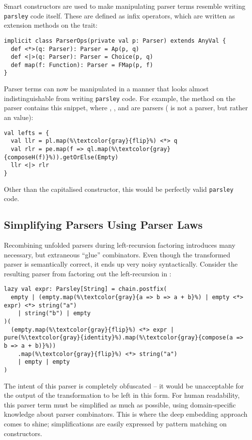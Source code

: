 \documentclass[../../../main.tex]{subfiles}
\begin{document}
Smart constructors are used to make manipulating parser terms resemble writing \texttt{parsley} code itself.
These are defined as infix operators, which are written as extension methods on the  trait:
\begin{verbatim}
implicit class ParserOps(private val p: Parser) extends AnyVal {
  def <*>(q: Parser): Parser = Ap(p, q)
  def <|>(q: Parser): Parser = Choice(p, q)
  def map(f: Function): Parser = FMap(p, f)
}
\end{verbatim}
%
Parser terms can now be manipulated in a manner that looks almost indistinguishable from writing \texttt{parsley} code.
For example, the  method on the  parser contains this snippet, where , , and  are parsers ( is not a parser, but rather an  value):
\begin{verbatim}
val lefts = {
  val llr = pl.map(%\textcolor{gray}{flip}%) <*> q
  val rlr = pe.map(f => ql.map(%\textcolor{gray}{composeH(f)}%)).getOrElse(Empty)
  llr <|> rlr
}
\end{verbatim}
Other than the capitalised  constructor, this would be perfectly valid \texttt{parsley} code.

\subsection{Simplifying Parsers Using Parser Laws}\label{sec:simplify-parsers}
Recombining unfolded parsers during left-recursion factoring introduces many necessary, but extraneous ``glue'' combinators.
Even though the transformed parser is semantically correct, it ends up very noisy syntactically.
Consider the resulting parser from factoring out the left-recursion in :
\begin{verbatim}
lazy val expr: Parsley[String] = chain.postfix(
  empty | (empty.map(%\textcolor{gray}{a => b => a + b}%) | empty <*> expr) <*> string("a")
    | string("b") | empty
)(
  (empty.map(%\textcolor{gray}{flip}%) <*> expr | pure(%\textcolor{gray}{identity}%).map(%\textcolor{gray}{compose(a => b => a + b)}%))
    .map(%\textcolor{gray}{flip}%) <*> string("a")
    | empty | empty
)
\end{verbatim}
%
The intent of this parser is completely obfuscated -- it would be unacceptable for the output of the transformation to be left in this form.
For human readability, this parser term must be simplified as much as possible, using domain-specific knowledge about parser combinators.
This is where the deep embedding approach comes to shine; simplifications are easily expressed by pattern matching on  constructors.
\end{document}
